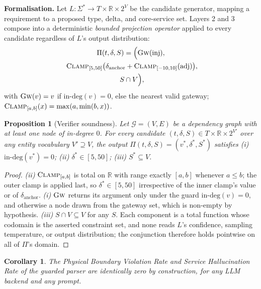 \documentclass[journal, 10pt]{IEEEtran}
\newtheorem{proposition}{Proposition}
\newtheorem{corollary}{Corollary}
\begin{document}
\textbf{Formalisation.} Let $L : \Sigma^* \to T \times \mathbb{R} \times 2^V$ be
the candidate generator, mapping a requirement to a proposed type, delta, and
core-service set. Layers 2 and 3 compose into a deterministic \emph{bounded
projection operator} applied to every candidate regardless of $L$'s output
distribution:
\begin{multline}
\Pi(t,\delta,S) = \Big(\textsc{Gw}(\text{inj}),\\
\ \textsc{Clamp}_{[5,50]}\big(\delta_{\text{anchor}} + \textsc{Clamp}_{[-10,10]}(\text{adj})\big),\\
\ S \cap V\Big),
\label{eq:projection}
\end{multline}
with $\textsc{Gw}(v) = v$ if $\text{in-deg}(v)=0$, else the nearest valid gateway;
$\textsc{Clamp}_{[a,b]}(x) = \max(a,\min(b,x))$.

\begin{proposition}[Verifier soundness]
\label{prop:soundness}
Let $\mathcal{G}=(V,E)$ be a dependency graph with at least one node of in-degree $0$. For every candidate $(t,\delta,S)\in T\times\mathbb{R}\times 2^{V'}$ over any entity vocabulary $V'\supseteq V$, the output $\Pi(t,\delta,S)=(v^*,\delta^*,S^*)$ satisfies
\emph{(i)} $\mathrm{in\text{-}deg}(v^*)=0$; \emph{(ii)} $\delta^*\in[5,50]$; \emph{(iii)} $S^*\subseteq V$.
\end{proposition}

\begin{proof}
\emph{(ii)} $\textsc{Clamp}_{[a,b]}$ is total on $\mathbb{R}$ with range exactly $[a,b]$ whenever $a\leq b$; the outer clamp is applied last, so $\delta^*\in[5,50]$ irrespective of the inner clamp's value or of $\delta_{\text{anchor}}$. \emph{(i)} $\textsc{Gw}$ returns its argument only under the guard $\mathrm{in\text{-}deg}(v)=0$, and otherwise a node drawn from the gateway set, which is non-empty by hypothesis. \emph{(iii)} $S\cap V\subseteq V$ for any $S$. Each component is a total function whose codomain is the asserted constraint set, and none reads $L$'s confidence, sampling temperature, or output distribution; the conjunction therefore holds pointwise on all of $\Pi$'s domain.
\end{proof}

\begin{corollary}
\label{cor:zero}
The Physical Boundary Violation Rate and Service Hallucination Rate of the guarded parser are identically zero by construction, for any LLM backend and any prompt.
\end{corollary}
\end{document}
